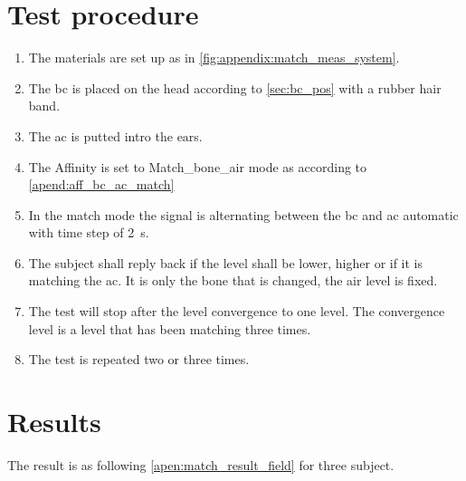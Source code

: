\section*{Test procedure}


\begin{enumerate}
\item The materials are set up as in \autoref{fig:appendix:match_meas_system}.
\item The \gls{bc} is placed on the head according to \autoref{sec:bc_pos} with a rubber hair band.
\item The \gls{ac} is putted intro the ears.
\item The Affinity is set to Match_bone_air mode as according to \autoref{apend:aff_bc_ac_match} 
\item In the match mode the signal is alternating between the \gls{bc} and \gls{ac} automatic with time step of \SI{2}{\second}.
\item The  subject shall reply back if the level shall be lower, higher or if it is matching  the \gls{ac}. It is only the bone that is changed, the air level is fixed.
\item The test will stop after the level convergence to one level. The convergence level is a level that has been matching three times.
\item The test is repeated two or three times.
\end{enumerate}

\section*{Results}

The result is as following \autoref{apen:match_result_field} for three subject. 

